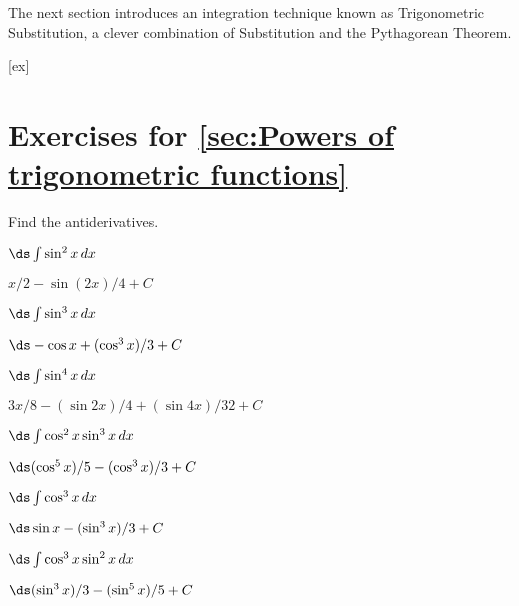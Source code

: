 The next section introduces an integration technique known as Trigonometric Substitution, a clever combination of Substitution and the Pythagorean Theorem.

[ex]
\section*{Exercises for \ref{sec:Powers of trigonometric functions}}

\begin{enumialphparenastyle}

Find the antiderivatives.

\begin{ex}
 $\ds\int \sin^2 x\,dx$
\begin{sol}
 $x/2-\sin(2x)/4+C$
\end{sol}
\end{ex}

\begin{ex}
 $\ds\int \sin^3 x\,dx$
\begin{sol}
 $\ds -\cos x+(\cos^3x)/3+C$
\end{sol}
\end{ex}

\begin{ex}
 $\ds\int \sin^4 x\,dx$
\begin{sol}
 $3x/8-(\sin 2x)/4+(\sin 4x)/32+C$
\end{sol}
\end{ex}

\begin{ex}
 $\ds\int \cos^2 x\sin^3 x\,dx$
\begin{sol}
 $\ds (\cos^5 x)/5-(\cos^3x)/3+C$
\end{sol}
\end{ex}

\begin{ex}
 $\ds\int \cos^3 x\,dx$
\begin{sol}
 $\ds \sin x-(\sin^3x)/3+C$
\end{sol}
\end{ex}

\begin{ex}
 $\ds\int \cos^3 x \sin^2 x\,dx$
\begin{sol}
 $\ds (\sin^3x)/3-(\sin^5x)/5+C$
\end{sol}
\end{ex}


\end{enumialphparenastyle}
